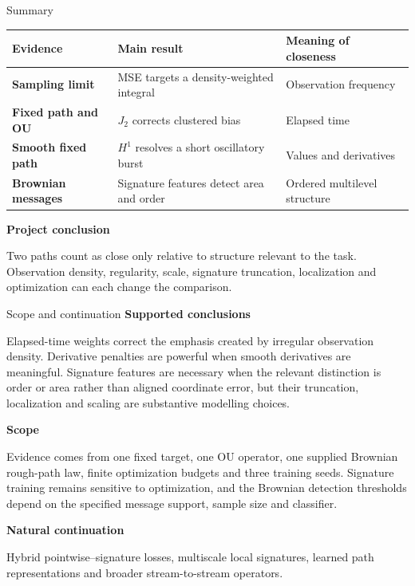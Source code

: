 \documentclass[aspectratio=169,9pt]{beamer}
\newcommand{\Jtwo}{J_2}
\begin{document}
\begin{frame}{Summary}
  \small
  \begin{tabular}{>{\bfseries}p{}p{}p{}}
    \toprule
    Evidence & Main result & Meaning of closeness \\
    \midrule
    Sampling limit & MSE targets a density-weighted integral & Observation frequency \\
    Fixed path and OU & $\Jtwo$ corrects clustered bias & Elapsed time \\
    Smooth fixed path & $H^1$ resolves a short oscillatory burst & Values and derivatives \\
    Brownian messages & Signature features detect area and order & Ordered multilevel structure \\
    \bottomrule
  \end{tabular}
  \textbf{Project conclusion}\par
  Two paths count as close only relative to structure relevant to the task. Observation density, regularity, scale, signature truncation, localization and optimization can each change the comparison.
\end{frame}

\begin{frame}{Scope and continuation}
  \textbf{Supported conclusions}\par
  Elapsed-time weights correct the emphasis created by irregular observation density. Derivative penalties are powerful when smooth derivatives are meaningful. Signature features are necessary when the relevant distinction is order or area rather than aligned coordinate error, but their truncation, localization and scaling are substantive modelling choices.

  \textbf{Scope}\par
  Evidence comes from one fixed target, one OU operator, one supplied Brownian rough-path law, finite optimization budgets and three training seeds. Signature training remains sensitive to optimization, and the Brownian detection thresholds depend on the specified message support, sample size and classifier.

  \textbf{Natural continuation}\par
  Hybrid pointwise--signature losses, multiscale local signatures, learned path representations and broader stream-to-stream operators.
\end{frame}
\end{document}

